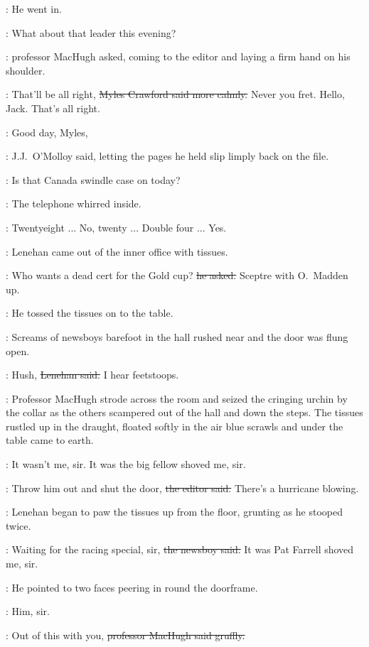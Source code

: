 :
He went in.

\machugh:
What about that leader this evening?

:
professor MacHugh asked,
coming to the editor and laying a firm hand on his shoulder.

\crawford:
That'll be all right,
\sout{Myles Crawford said more calmly.}
Never you fret.
Hello, Jack.
That's all right.

\jjom:
Good day, Myles,

:
J.J.~O'Molloy said,
letting the pages he held slip limply back on the file.

\jjom:
Is that Canada swindle case on today?

:
The telephone whirred inside.

\Bloom:
Twentyeight ...
No, twenty ...
Double four ...
Yes.



:
Lenehan came out of the inner office with  tissues.

\lenehan:
Who wants a dead cert for the Gold cup?
\sout{he asked.}
Sceptre with O.~Madden up.

:
He tossed the tissues on to the table.

:
Screams of newsboys barefoot in the hall rushed near
and the door was flung open.

\lenehan:
Hush,
\sout{Lenehan said.}
I hear feetstoops.

:
Professor MacHugh strode across the room
and seized the cringing urchin by the collar
as the others scampered out of the hall and down the steps.
The tissues rustled up in the draught,
floated softly in the air
blue scrawls
and under the table came to earth.

\boy:
It wasn't me, sir.
It was the big fellow shoved me, sir.

\crawford:
Throw him out and shut the door,
\sout{the editor said.}
There's a hurricane blowing.

:
Lenehan began to paw the tissues up from the floor,
grunting as he stooped twice.

\boy:
Waiting for the racing special, sir,
\sout{the newsboy said.}
It was Pat Farrell shoved me, sir.

:
He pointed to two faces peering in round the doorframe.

\boy:
Him, sir.

\machugh:
Out of this with you,
\sout{professor MacHugh said gruffly.}

